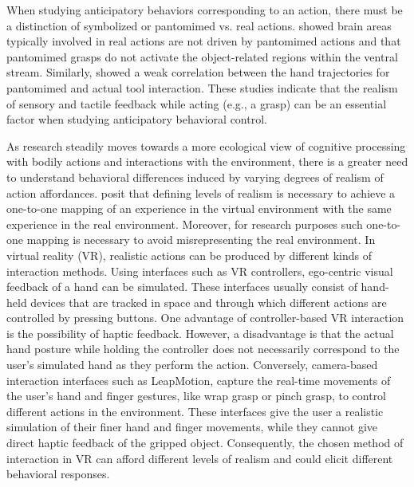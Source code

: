 When studying anticipatory behaviors corresponding to an action, there must be a distinction of symbolized or pantomimed vs. real actions. \citet{Kroliczak2007-wo} showed brain areas typically involved in real actions are not driven by pantomimed actions and that pantomimed grasps do not activate the object-related regions within the ventral stream. Similarly, \citet{Hermsdorfer2012-ca} showed a weak correlation between the hand trajectories for pantomimed and actual tool interaction. These studies indicate that the realism of sensory and tactile feedback while acting (e.g., a grasp) can be an essential factor when studying anticipatory behavioral control.

As research steadily moves towards a more ecological view of cognitive processing with bodily actions and interactions with the environment, there is a greater need to understand behavioral differences induced by varying degrees of realism of action affordances. \citet{Chalmers2008-vr} posit that defining levels of realism is necessary to achieve a one-to-one mapping of an experience in the virtual environment with the same experience in the real environment. Moreover, for research purposes such one-to-one mapping is necessary to avoid misrepresenting the real environment. In virtual reality (VR), realistic actions can be produced by different kinds of interaction methods. Using interfaces such as VR controllers, ego-centric visual feedback of a hand can be simulated. These interfaces usually consist of hand-held devices that are tracked in space and through which different actions are controlled by pressing buttons. One advantage of controller-based VR interaction is the possibility of haptic feedback. However, a disadvantage is that the actual hand posture while holding the controller does not necessarily correspond to the user’s simulated hand as they perform the action. Conversely, camera-based interaction interfaces such as LeapMotion, capture the real-time movements of the user’s hand and finger gestures, like wrap grasp or pinch grasp, to control different actions in the environment. These interfaces give the user a realistic simulation of their finer hand and finger movements, while they cannot give direct haptic feedback of the gripped object. Consequently, the chosen method of interaction in VR can afford different levels of realism and could elicit different behavioral responses.

